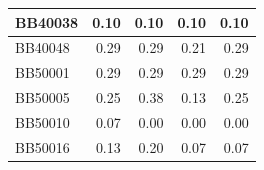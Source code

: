 \begin{table}[!htbp]
\begin{adjustwidth}{-0.6cm}{}
\begin{tabular}{|l|r|r|r|r|}
		\hline
		BB40038 & \cellcolor[rgb]{ .988,  1,  .992}0.10 & \cellcolor[rgb]{ .988,  1,  .992}0.10 & \cellcolor[rgb]{ .988,  1,  .992}0.10 & \cellcolor[rgb]{ .988,  1,  .992}0.10 \\
		\hline
		BB40048 & \cellcolor[rgb]{ .988,  1,  .992}0.29 & \cellcolor[rgb]{ .988,  1,  .992}0.29 & \cellcolor[rgb]{ .384,  .745,  .478}0.21 & \cellcolor[rgb]{ .988,  1,  .992}0.29 \\
		\hline
		BB50001 & \cellcolor[rgb]{ .988,  1,  .992}0.29 & \cellcolor[rgb]{ .988,  1,  .992}0.29 & \cellcolor[rgb]{ .988,  1,  .992}0.29 & \cellcolor[rgb]{ .988,  1,  .992}0.29 \\
		\hline
		BB50005 & \cellcolor[rgb]{ .686,  .871,  .733}0.25 & \cellcolor[rgb]{ .988,  1,  .992}0.38 & \cellcolor[rgb]{ .384,  .745,  .478}0.13 & \cellcolor[rgb]{ .686,  .871,  .733}0.25 \\
		\hline
		BB50010 & \cellcolor[rgb]{ .988,  1,  .992}0.07 & \cellcolor[rgb]{ .384,  .745,  .478}0.00 & \cellcolor[rgb]{ .384,  .745,  .478}0.00 & \cellcolor[rgb]{ .384,  .745,  .478}0.00 \\
		\hline
		BB50016 & \cellcolor[rgb]{ .682,  .871,  .733}0.13 & \cellcolor[rgb]{ .988,  1,  .992}0.20 & \cellcolor[rgb]{ .384,  .745,  .478}0.07 & \cellcolor[rgb]{ .384,  .745,  .478}0.07 \\
		\hline
	\end{tabular}\label{tab:pmao-variants-a}\end{adjustwidth}
\end{table}

